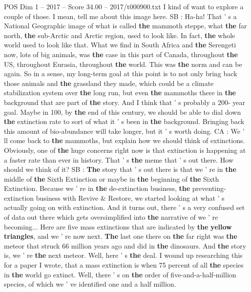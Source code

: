 \begin{textsample}{POS Dim 1 – 2017 – Score 34.00 – 2017/t000900.txt}
I kind of want to explore a couple of those.
I mean, tell me about this image here.
SB : Ha-ha!
That ' s a National Geographic image of what is called \textbf{the} mammoth steppe, what \textbf{the} far north, \textbf{the} sub-Arctic and Arctic region, used to look like.
In fact, \textbf{the} whole world used to look like that.
What we find in South Africa and \textbf{the} Serengeti now, lots of big animals, was \textbf{the} case in this part of Canada, throughout \textbf{the} US, throughout Eurasia, throughout \textbf{the} world.
This was \textbf{the} norm and can be again.
So in a sense, my long-term goal at this point is to not only bring back those animals and \textbf{the} grassland they made, which could be a climate stabilization system over \textbf{the} long run, but even \textbf{the} mammoths there in \textbf{the} background that are part of \textbf{the} story.
And I think that ' s probably a 200- year goal.
Maybe in 100, by \textbf{the} end of this century, we should be able to dial down \textbf{the} extinction rate to sort of what it ' s been in \textbf{the} background.
Bringing back this amount of bio-abundance will take longer, but it ' s worth doing.
CA : We ' ll come back to \textbf{the} mammoths, but explain how we should think of extinctions.
Obviously, one of \textbf{the} huge concerns right now is that extinction is happening at a faster rate than ever in history.
That ' s \textbf{the} meme that ' s out there.
How should we think of it?
SB : \textbf{The} story that ' s out there is that we ' re in \textbf{the} middle of \textbf{the} Sixth Extinction or maybe in \textbf{the} beginning of \textbf{the} Sixth Extinction.
Because we ' re in \textbf{the} de-extinction business, \textbf{the} preventing-extinction business with Revive \& Restore, we started looking at what ' s actually going on with extinction.
And it turns out, there ' s a very confused set of data out there which gets oversimplified into \textbf{the} narrative of we ' re becoming...
Here are five mass extinctions that are indicated by \textbf{the} \textbf{yellow} \textbf{triangles}, and we ' re now next. \textbf{The} last one there on \textbf{the} far right was \textbf{the} meteor that struck 66 million years ago and did in \textbf{the} dinosaurs.
And \textbf{the} story is, we ' re \textbf{the} next meteor.
Well, here ' s \textbf{the} deal.
I wound up researching this for a paper I wrote, that a mass extinction is when 75 percent of all \textbf{the} species in \textbf{the} world go extinct.
Well, there ' s on \textbf{the} order of five-and-a-half-million species, of which we ' ve identified one and a half million.

\end{textsample}
